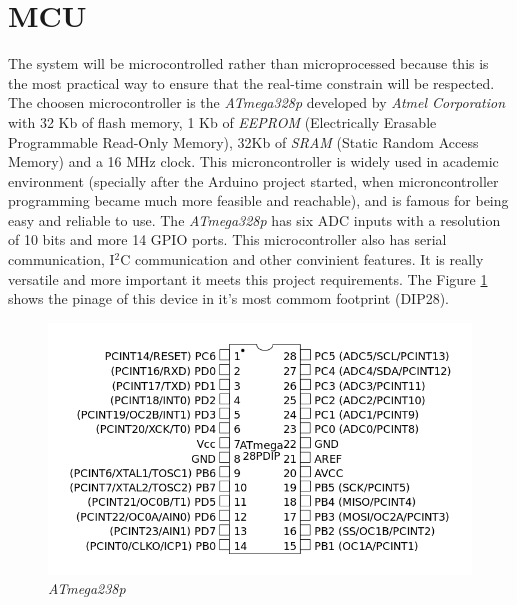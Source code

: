\section{MCU}
		The system will be microcontrolled rather than microprocessed because this is the most practical way to ensure that the real-time constrain will be respected. The choosen microcontroller is the \textit{ATmega328p} developed by \textit{Atmel Corporation} with 32 Kb of flash memory, 1 Kb of \textit{EEPROM} (Electrically Erasable Programmable Read-Only Memory), 32Kb of \textit{SRAM} (Static Random Access Memory) and a 16 MHz clock. This microncontroller is widely used in academic environment (specially after the Arduino project started, when microncontroller programming became much more feasible and reachable), and is famous for being easy and reliable to use. The \textit{ATmega328p} has six ADC inputs with a resolution of 10 bits and more 14 GPIO ports. This microcontroller also has serial communication, I$^2$C communication and other convinient features. It is really versatile and more important it meets this project requirements. The Figure \ref{fig-atmega328p} shows the pinage of this device in it's most commom footprint (DIP28).

		\begin{figure}[htbp]
			\centering
			\includegraphics[scale=0.45]{figuras/fig-atmega328p.png}
			\caption{\textit{ATmega238p} \cite{coorporation2011atmel}}
			\label{fig-atmega328p}
		\end{figure}
	
